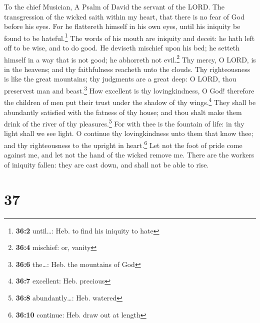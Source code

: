 To the chief Musician, A Psalm of David the servant of the LORD.
 The transgression of the wicked saith within my heart,
that there is no fear of God before his eyes.  For he
flattereth himself in his own eyes, until his iniquity be found to be
hateful.\footnote{\textbf{36:2} until\ldots: Heb. to find his iniquity
  to hate}  The words of his mouth are iniquity and
deceit: he hath left off to be wise, and to do good.  He
deviseth mischief upon his bed; he setteth himself in a way that is not
good; he abhorreth not evil.\footnote{\textbf{36:4} mischief: or, vanity}
 Thy mercy, O LORD, is in the heavens; and thy
faithfulness reacheth unto the clouds.  Thy righteousness
is like the great mountains; thy judgments are a great deep: O LORD,
thou preservest man and beast.\footnote{\textbf{36:6} the\ldots: Heb.
  the mountains of God}  How excellent is thy
lovingkindness, O God! therefore the children of men put their trust
under the shadow of thy wings.\footnote{\textbf{36:7} excellent: Heb.
  precious}  They shall be abundantly satisfied with the
fatness of thy house; and thou shalt make them drink of the river of thy
pleasures.\footnote{\textbf{36:8} abundantly\ldots: Heb. watered}
 For with thee is the fountain of life: in thy light shall
we see light.  O continue thy lovingkindness unto them
that know thee; and thy righteousness to the upright in
heart.\footnote{\textbf{36:10} continue: Heb. draw out at length}
 Let not the foot of pride come against me, and let not
the hand of the wicked remove me.  There are the workers
of iniquity fallen: they are cast down, and shall not be able to rise.

\hypertarget{section-36}{%
\section{37}\label{section-36}}


